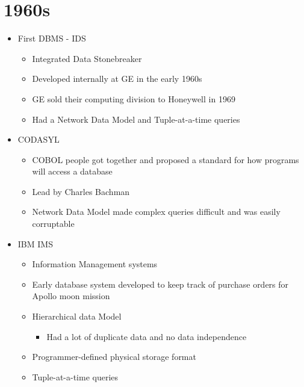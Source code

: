 \documentclass[11pt]{article}
\begin{document}
\section{1960s}
\begin{itemize}
    \item First DBMS - IDS
    \begin{itemize}
        \item Integrated Data Stonebreaker
        \item Developed internally at GE in the early 1960s
        \item GE sold their computing division to Honeywell in 1969
        \item Had a Network Data Model and Tuple-at-a-time queries
    \end{itemize}
    \item CODASYL
    \begin{itemize}
        \item COBOL people got together and proposed a standard for how programs will access a database
        \item Lead by Charles Bachman
        \item Network Data Model made complex queries difficult and was easily corruptable
    \end{itemize}
    \item IBM IMS
    \begin{itemize}
        \item Information Management systems
        \item Early database system developed to keep track of purchase orders for Apollo moon mission
        \item Hierarchical data Model
        \begin{itemize}
            \item Had a lot of duplicate data and no data independence
        \end{itemize}
        \item Programmer-defined physical storage format
        \item Tuple-at-a-time queries
    \end{itemize}
\end{itemize}
\end{document}

